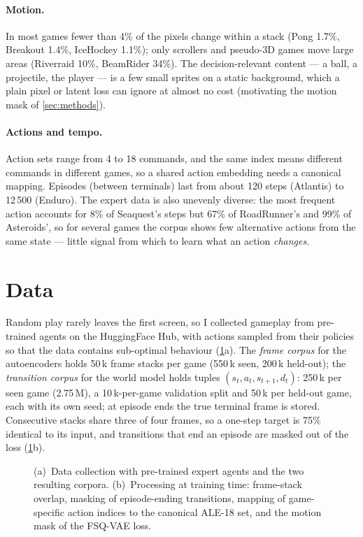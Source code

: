 \documentclass[runningheads]{llncs}
\begin{document}
\paragraph{Motion.} In most games fewer than 4\% of the pixels change within a stack (Pong
1.7\%, Breakout 1.4\%, IceHockey 1.1\%); only scrollers and pseudo-3D games move large areas
(Riverraid 10\%, BeamRider 34\%). The decision-relevant content --- a ball, a projectile, the
player --- is a few small sprites on a static background, which a plain pixel or latent loss
can ignore at almost no cost (motivating the motion mask of \cref{sec:methods}).

\paragraph{Actions and tempo.} Action sets range from 4 to 18 commands, and the same index
means different commands in different games, so a shared action embedding needs a canonical
mapping. Episodes (between terminals) last from about 120 steps (Atlantis) to 12\,500
(Enduro). The expert data is also unevenly diverse: the most frequent action accounts for
8\% of Seaquest's steps but 67\% of RoadRunner's and 99\% of Asteroids', so for several games
the corpus shows few alternative actions from the same state --- little signal from which to
learn what an action \emph{changes}.

\section{Data}
\label{sec:data}

Random play rarely leaves the first screen, so I collected gameplay from pre-trained agents
on the HuggingFace Hub, with actions sampled from their policies so that the data contains
sub-optimal behaviour (\cref{fig:data}a). The \emph{frame corpus} for the autoencoders holds
50\,k frame stacks per game (550\,k seen, 200\,k held-out); the \emph{transition corpus} for
the world model holds tuples $(s_t,a_t,s_{t+1},d_t)$: 250\,k per seen game (2.75\,M), a
10\,k-per-game validation split and 50\,k per held-out game, each with its own seed; at episode
ends the true terminal frame is stored. Consecutive stacks share three of four frames, so a
one-step target is 75\% identical to its input, and transitions that end an episode are
masked out of the loss (\cref{fig:data}b).

\begin{figure}[t]
\centering

\caption{(a)~Data collection with pre-trained expert agents and the two resulting corpora.
(b)~Processing at training time: frame-stack overlap, masking of episode-ending
transitions, mapping of game-specific action indices to the canonical ALE-18 set, and the
motion mask of the FSQ-VAE loss.}
\label{fig:data}
\end{figure}
\end{document}
